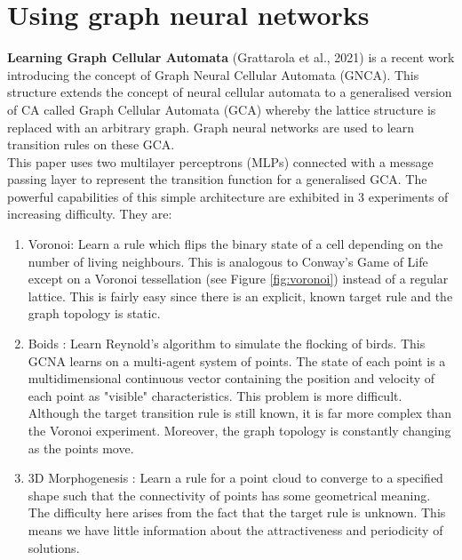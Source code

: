 \section{Using graph neural networks}
\label{sec: using-gnn}

\noindent
\textbf{Learning Graph Cellular Automata} (Grattarola et al., 2021) \cite{grattarola2021learning} is a recent work introducing the concept of Graph Neural Cellular Automata (GNCA).
This structure extends the concept of neural cellular automata to a generalised version of CA called Graph Cellular Automata (GCA) whereby the lattice structure is replaced with an arbitrary graph.
Graph neural networks are used to learn transition rules on these GCA.\\

This paper uses two multilayer perceptrons (MLPs) connected with a message passing layer to represent the transition function for a generalised GCA.
The powerful capabilities of this simple architecture are exhibited in 3 experiments of increasing difficulty. They are:

\begin{enumerate}
  \item Voronoi: Learn a rule which flips the binary state of a cell depending on the number of living neighbours. This is analogous to Conway's Game of Life except on a Voronoi tessellation (see Figure \ref{fig:voronoi}) instead of a regular lattice. This is fairly easy since there is an explicit, known target rule and the graph topology is static. 
  \item Boids : Learn Reynold's algorithm \cite{reynolds1987flocks} to simulate the flocking of birds. This GCNA learns on a multi-agent system of points. The state of each point is a multidimensional continuous vector containing the position and velocity of each point as "visible" characteristics. This problem is more difficult. Although the target transition rule is still known, it is far more complex than the Voronoi experiment. Moreover, the graph topology is constantly changing as the points move.
  \item 3D Morphogenesis : Learn a rule for a point cloud to converge to a specified shape such that the connectivity of points has some geometrical meaning. The difficulty here arises from the fact that the target rule is unknown. This means we have little information about the attractiveness and periodicity of solutions.
\end{enumerate}

